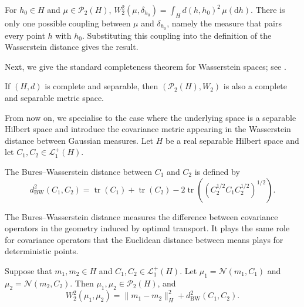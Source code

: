 \begin{example}\label{ex:Dirac optimal transport}
For \(h_0\in H\) and \(\mu\in\mathcal P_2(H)\), \(W_2^2(\mu,\delta_{h_0})=\int_H d(h,h_0)^2\,\mu(\mathrm dh)\).
There is only one possible coupling between \(\mu\) and \(\delta_{h_0}\), namely the measure that pairs every point \(h\) with \(h_0\). Substituting this coupling into the definition of the Wasserstein distance gives the result.
\end{example}

Next, we give the standard completeness theorem for Wasserstein spaces; see \cite[Theorem~6.18]{Villani2009}.

\begin{theorem}\label{thm:Completeness of the Wasserstein space}
If \((H,d)\) is complete and separable, then \((\mathcal P_2(H),W_2)\) is also a complete and separable metric space.
\end{theorem}

From now on, we specialise to the case where the underlying space is a separable Hilbert space and introduce the covariance metric appearing in the Wasserstein distance between Gaussian measures. Let \(H\) be a real separable Hilbert space and let \(C_1,C_2\in\mathcal L_1^+(H)\).

\begin{definition}
The Bures--Wasserstein distance between \(C_1\) and \(C_2\) is defined by
\[d_{\mathrm{BW}}^2(C_1,C_2)=\operatorname{tr}(C_1)+\operatorname{tr}(C_2)-2\operatorname{tr}((C_2^{1/2}C_1C_2^{1/2})^{1/2}).\]
\end{definition}

The Bures--Wasserstein distance measures the difference between covariance operators in the geometry induced by optimal transport. It plays the same role for covariance operators that the Euclidean distance between means plays for deterministic points.

\begin{theorem}\label{thm:Wasserstein distance between Gaussian measures}
Suppose that \(m_1,m_2\in H\) and \(C_1,C_2\in\mathcal L_1^+(H)\). Let \(\mu_1=\mathcal N(m_1,C_1)\) and \(\mu_2=\mathcal N(m_2,C_2)\). Then \(\mu_1,\mu_2\in\mathcal P_2(H)\), and
\[
W_2^2(\mu_1,\mu_2)=\|m_1-m_2\|_H^2+d_{\mathrm{BW}}^2(C_1,C_2).
\]
\end{theorem}

